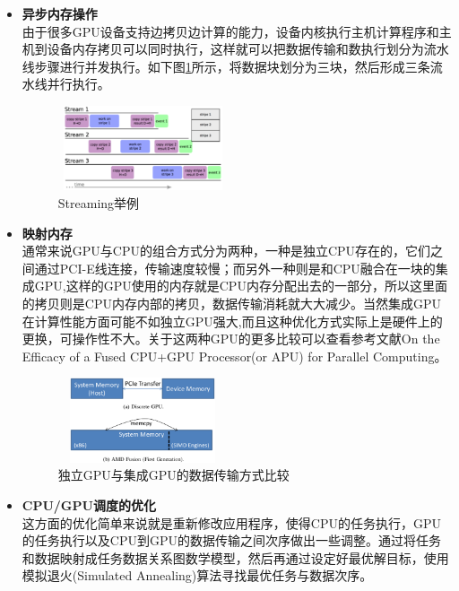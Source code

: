 \begin{itemize}
\item{\textbf{异步内存操作}} \\
由于很多GPU设备支持边拷贝边计算的能力，设备内核执行主机计算程序和主机到设备内存拷贝可以同时执行，这样就可以把数据传输和数执行划分为流水线步骤进行并发执行。如下图\ref{fig:Streaming}所示，将数据块划分为三块，然后形成三条流水线并行执行。
\\

\begin{figure}[H] 
  \centering
  \includegraphics[width=5cm,height=2.5cm]{figures/chap02/Streaming}
  \caption{Streaming举例}
  \label{fig:Streaming}
\end{figure}
\item{\textbf{映射内存}} \\
通常来说GPU与CPU的组合方式分为两种，一种是独立CPU存在的，它们之间通过PCI-E线连接，传输速度较慢；而另外一种则是和CPU融合在一块的集成GPU,这样的GPU使用的内存就是CPU内存分配出去的一部分，所以这里面的拷贝则是CPU内存内部的拷贝，数据传输消耗就大大减少。当然集成GPU在计算性能方面可能不如独立GPU强大,而且这种优化方式实际上是硬件上的更换，可操作性不大。关于这两种GPU的更多比较可以查看参考文献On the Efficacy of a Fused CPU+GPU Processor(or APU) for Parallel Computing\cite{on-the-Efficacy}。
\\
\begin{figure}[H] 
  \centering
  \includegraphics[width=5cm,height=2.5cm]{figures/chap02/Transfer}
  \caption{独立GPU与集成GPU的数据传输方式比较}
  \label{fig:Transfer}
\end{figure}
\item{\textbf{CPU/GPU调度的优化}} \\
这方面的优化简单来说就是重新修改应用程序，使得CPU的任务执行，GPU的任务执行以及CPU到GPU的数据传输之间次序做出一些调整。通过将任务和数据映射成任务数据关系图数学模型，然后再通过设定好最优解目标，使用模拟退火(Simulated Annealing)算法寻找最优任务与数据次序。
\end{itemize}

